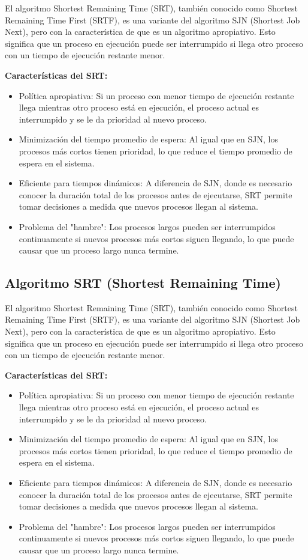 El algoritmo Shortest Remaining Time (SRT), también conocido como Shortest Remaining Time First (SRTF), es una variante del algoritmo SJN (Shortest Job Next), pero con la característica de que es un algoritmo apropiativo. Esto significa que un proceso en ejecución puede ser interrumpido si llega otro proceso con un tiempo de ejecución restante menor.

\textbf{Características del SRT:} 
\begin{itemize} 
    \item Política apropiativa: Si un proceso con menor tiempo de ejecución restante llega mientras otro proceso está en ejecución, el proceso actual es interrumpido y se le da prioridad al nuevo proceso. 
    \item Minimización del tiempo promedio de espera: Al igual que en SJN, los procesos más cortos tienen prioridad, lo que reduce el tiempo promedio de espera en el sistema. 
    \item Eficiente para tiempos dinámicos: A diferencia de SJN, donde es necesario conocer la duración total de los procesos antes de ejecutarse, SRT permite tomar decisiones a medida que nuevos procesos llegan al sistema. 
    \item Problema del "hambre": Los procesos largos pueden ser interrumpidos continuamente si nuevos procesos más cortos siguen llegando, lo que puede causar que un proceso largo nunca termine. 
\end{itemize}


\subsection{Algoritmo SRT (Shortest Remaining Time)}

El algoritmo Shortest Remaining Time (SRT), también conocido como Shortest Remaining Time First (SRTF), es una variante del algoritmo SJN (Shortest Job Next), pero con la característica de que es un algoritmo apropiativo. Esto significa que un proceso en ejecución puede ser interrumpido si llega otro proceso con un tiempo de ejecución restante menor.

\textbf{Características del SRT:}
 \begin{itemize} 
 	\item Política apropiativa: Si un proceso con menor tiempo de ejecución restante llega mientras otro proceso está en ejecución, el proceso actual es interrumpido y se le da prioridad al nuevo proceso. 
 	\item Minimización del tiempo promedio de espera: Al igual que en SJN, los procesos más cortos tienen prioridad, lo que reduce el tiempo promedio de espera en el sistema. \item Eficiente para tiempos dinámicos: A diferencia de SJN, donde es necesario conocer la duración total de los procesos antes de ejecutarse, SRT permite tomar decisiones a medida que nuevos procesos llegan al sistema. 
 	\item Problema del "hambre": Los procesos largos pueden ser interrumpidos continuamente si nuevos procesos más cortos siguen llegando, lo que puede causar que un proceso largo nunca termine. \end{itemize}

